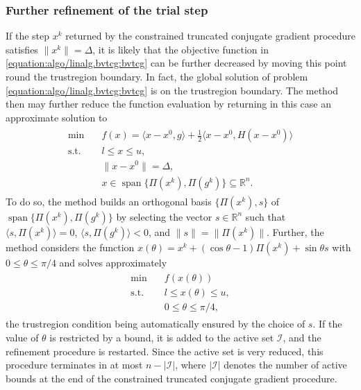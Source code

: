 \documentclass[letterpaper,10pt,english]{sphinxmanual}
\DeclareMathOperator{\vspan}{span}
\newcommand{\abs}[2][]{#1\lvert#2#1\rvert}
\newcommand{\norm}[2][]{#1\lVert#2#1\rVert}
\newcommand{\set}[2][]{#1\{#2#1\}}
\newcommand{\inner}[2][]{#1\langle#2#1\rangle}
\def\R{\ensuremath{\mathds{R}}}
\begin{document}
\subsubsection{Further refinement of the trial step}
\label{\detokenize{algo/linalg.bvtcg:further-refinement-of-the-trial-step}}
\sphinxAtStartPar
If the step \(x^k\) returned by the constrained truncated conjugate
gradient procedure satisfies \(\norm{x^k} = \Delta\), it is likely that
the objective function in \eqref{equation:algo/linalg.bvtcg:bvtcg} can be further decreased by moving this
point round the trust\sphinxhyphen{}region boundary. In fact, the global solution of problem
\eqref{equation:algo/linalg.bvtcg:bvtcg} is on the trust\sphinxhyphen{}region boundary. The method  then may
further reduce the function evaluation by returning in this case an approximate
solution to
\begin{equation*}
\begin{split}\begin{array}{ll}
    \min        & \quad f(x) = \inner{x - x^0, g} + \frac{1}{2} \inner{x - x^0, H (x - x^0)}\\
    \text{s.t.} & \quad l \le x \le u,\\
                & \quad \norm{x - x^0} = \Delta,\\
                & \quad x \in \vspan \set{\Pi(x^k), \Pi(g^k)} \subseteq \R^n.
\end{array}\end{split}
\end{equation*}
\sphinxAtStartPar
To do so, the method builds an orthogonal basis \(\set{\Pi(x^k), s}\) of
\(\vspan \set{\Pi(x^k), \Pi(g^k)}\) by selecting the vector
\(s \in \R^n\) such that \(\inner{s, \Pi(x^k)} = 0\),
\(\inner{s, \Pi(g^k)} < 0\), and \(\norm{s} = \norm{\Pi(x^k)}\).
Further, the method considers the function
\(x(\theta) = x^k + (\cos \theta - 1) \Pi(x^k) + \sin \theta s\) with
\(0 \le \theta \le \pi / 4\) and solves approximately
\begin{equation*}
\begin{split}\begin{array}{ll}
    \min        & \quad f(x(\theta))\\
    \text{s.t.} & \quad l \le x(\theta) \le u,\\
                & \quad 0 \le \theta \le \pi / 4,
\end{array}\end{split}
\end{equation*}
\sphinxAtStartPar
the trust\sphinxhyphen{}region condition being automatically ensured by the choice of
\(s\). If the value of \(\theta\) is restricted by a bound, it is added
to the active set \(\mathcal{I}\), and the refinement procedure is
restarted. Since the active set is very reduced, this procedure terminates in
at most \(n - \abs{\mathcal{I}}\), where \(\abs{\mathcal{I}}\) denotes
the number of active bounds at the end of the constrained truncated conjugate
gradient procedure.
\end{document}
